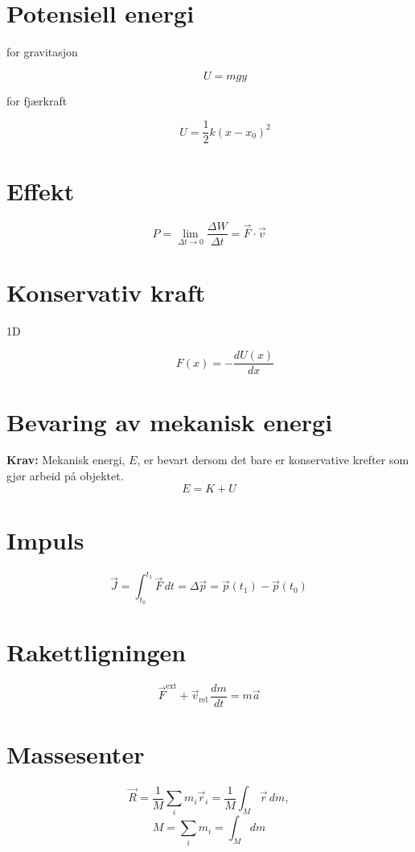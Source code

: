 \documentclass[a4paper,9pt]{extarticle}
\begin{document}
\begin{multicols}{2}
\section*{Potensiell energi}
\begin{description}
\item [for gravitasjon] \[ U = mgy \]
\item [for fjærkraft] \[ U = \frac{1}{2} k (x - x_0)^2 \]
\end{description}


\section*{Effekt}
\[ P = \lim_{\Delta t \to 0} \frac{\Delta W}{\Delta t} = \vec{F} \cdot \vec{v} \]


\section*{Konservativ kraft}
\begin{description}
\item [1D] \[ F(x) = - \frac{dU(x)}{dx} \]
\end{description}


\section*{Bevaring av mekanisk energi}
\textbf{Krav:} Mekanisk energi, $E$, er bevart dersom det bare er konservative krefter som gjør arbeid på objektet.
$$ E = K + U$$


\section*{Impuls}
\[ \vec{J} = \int_{t_0}^{t_1} \vec{F} \, dt = \Delta \vec{p} = \vec{p}(t_1) - \vec{p}(t_0) \]


\section*{Rakettligningen}
\[ \vec{F}^{\mathrm{ext}} + \vec{v}_{\mathrm{rel}} \, \frac{dm}{dt} = m \vec{a} \]


\section*{Massesenter}
\[ 
\vec{R} = \frac{1}{M} \sum_i m_i \vec{r}_i = \frac{1}{M} \int_M \vec{r} \, dm, 
\]
\[ 
 M = \sum_i m_i = \int_M dm 
\]



\end{multicols}
\end{document}
